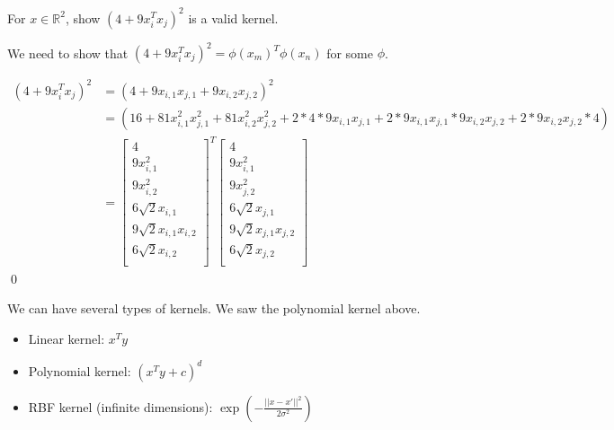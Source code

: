 \begin{example}
    For $x \in \mathbb{R}^2$, show $(4+9x_i^Tx_j)^2$ is a valid kernel.

    We need to show that $(4+9x_i^Tx_j)^2 = \phi(x_m)^T \phi(x_n)$ for some $\phi$.

    \begin{equation*}
        \begin{split}
            (4+9x_i^Tx_j)^2 &= (4+9x_{i,1}x_{j,1} + 9x_{i,2}x_{j,2})^2 \\
            &= (16 + 81x_{i,1}^2x_{j,1}^2 + 81x_{i,2}^2x_{j,2}^2 + 2 * 4 * 9x_{i,1}x_{j,1} + 2 * 9x_{i,1}x_{j,1} * 9x_{i,2}x_{j,2} + 2 * 9x_{i,2}x_{j,2} * 4) \\
            &= \begin{bmatrix}
                4 \\
                9x_{i,1}^2 \\
                9x_{i,2}^2 \\
                6\sqrt{2}x_{i,1} \\
                9\sqrt{2}x_{i,1}x_{i,2} \\
                6\sqrt{2}x_{i,2} \\
            \end{bmatrix}^T \begin{bmatrix}
                4 \\
                9x_{i,1}^2 \\
                9x_{j,2}^2 \\
                6\sqrt{2}x_{j,1} \\
                9\sqrt{2}x_{j,1}x_{j,2} \\
                6\sqrt{2}x_{j,2} \\
            \end{bmatrix}
        \end{split}
    \end{equation*}
    \qed{}

\end{example}

\begin{absolutelynopagebreak}
    We can have several types of kernels. We saw the polynomial kernel above. 
    \begin{itemize}
        \item Linear kernel: $x^Ty$
        \item Polynomial kernel: $(x^Ty + c)^d$
        \item RBF kernel (infinite dimensions): $\exp(-\frac{||x-x'||^2}{2\sigma^2})$
    \end{itemize}
\end{absolutelynopagebreak}


